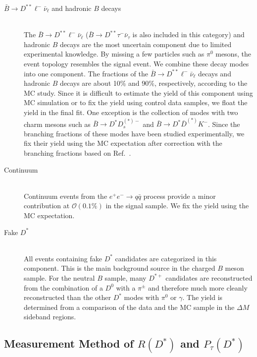 \documentclass[aps,prd,twocolumn,superscriptaddress,showpacs,preprintnumbers,amsmath,amssymb]{revtex4-1}
\begin{document}
\begin{description}
\item[\textbf{\boldmath$\bar{B} \rightarrow D^{**} \ell^- \bar{\nu}_\ell$} and hadronic \textbf{\boldmath$B$} decays]\mbox{}\\
  The $\bar{B} \rightarrow D^{**} \ell^- \bar{\nu}_\ell$ ($\bar{B} \rightarrow D^{**} \tau^- \bar{\nu}_\tau$ is also included in this category) and hadronic $B$ decays are the most uncertain component due to limited experimental knowledge. By missing a few particles such as $\pi^0$ mesons, the event topology resembles the signal event. We combine these decay modes into one component. The fractions of the $\bar{B} \rightarrow D^{**} \ell^- \bar{\nu}_\ell$ decays and hadronic $B$ decays are about 10\% and 90\%, respectively, according to the MC study. Since it is difficult to estimate the yield of this component using MC simulation or to fix the yield using control data samples, we float the yield in the final fit. One exception is the collection of modes with two charm mesons such as $\bar{B} \rightarrow D^* D_s^{(*)-}$ and $\bar{B} \rightarrow D^* \bar{D}^{(*)} K^-$. Since the branching fractions of these modes have been studied experimentally, we fix their yield using the MC expectation after correction with the branching fractions based on Ref.~\cite{cite:PDG:2016}.
\item[Continuum]\mbox{}\\
  Continuum events from the $e^+ e^- \rightarrow q{\bar q}$ process provide a minor contribution at $\mathcal{O}(0.1\%)$ in the signal sample. We fix the yield using the MC expectation.
\item[Fake \textbf{\boldmath$D^*$}]\mbox{}\\
  All events containing fake $D^*$ candidates are categorized in this component. This is the main background source in the charged $B$ meson sample. For the neutral $B$ sample, many $D^{*+}$ candidates are reconstructed from the combination of a $D^0$ with a $\pi^\pm$ and therefore much more cleanly reconstructed than the other $D^*$ modes with $\pi^0$ or $\gamma$. The yield is determined from a comparison of the data and the MC sample in the $\Delta M$ sideband regions.
\end{description}



\subsection{Measurement Method of \textbf{\boldmath$R(D^*)$} and \textbf{\boldmath$P_\tau(D^*)$}}\label{subsec:sig-recon}
\end{document}
